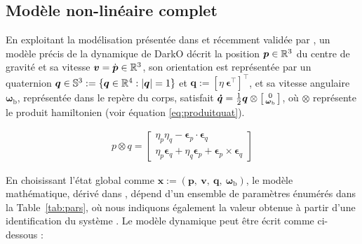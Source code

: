 \subsection{Modèle non-linéaire complet}

En exploitant la modélisation présentée dans \cite{lustosaHal-03035938, olszaneckibarthHal-02542982} et récemment validée par \cite{MuraliMorenoLustosa2024}, un modèle précis de la dynamique de DarkO décrit la position $\boldsymbol{p} \in {\mathbb R}^3$ du centre de gravité et sa vitesse $\boldsymbol{v} = \dot{\boldsymbol{p}} \in {\mathbb R}^3$, son orientation est représentée par un quaternion $\boldsymbol{q} \in {\mathbb S}^3:=\{ \boldsymbol{q} \in {\mathbb R}^4 : |\boldsymbol{q}| = 1\}$ et $\boldsymbol{q} := \left[ \eta ~ \boldsymbol{\epsilon}^\top \right]^\top$, et sa vitesse angulaire $\boldsymbol{\omega}_{\text{b}}$, représentée dans le repère du corps, satisfait $\boldsymbol{\dot q} = \frac{1}{2}\boldsymbol{q} \otimes \left[ \begin{smallmatrix}0 \\ \boldsymbol{\omega}_{{\text{b}}} \end{smallmatrix} \right]$, où $\otimes$ représente le produit hamiltonien (voir équation \eqref{eq:produitquat}).

\begin{align}
    \label{eq:produitquat}
    p \otimes q = \begin{bmatrix}
        \eta_{p} \eta_{q}- \boldsymbol{\epsilon}_{p} \cdot \boldsymbol{\epsilon}_{q}\\
        \eta_{p}\boldsymbol{\epsilon}_{q}+ \eta_{q}\boldsymbol{\epsilon}_{p} + \boldsymbol{\epsilon}_{p} \times \boldsymbol{\epsilon}_{q}
    \end{bmatrix}
\end{align}

En choisissant l'état global comme $\boldsymbol{x}:=(\boldsymbol{p},~ \boldsymbol{v},~ \boldsymbol{q},~ \boldsymbol{\omega}_{\text{b}})$, le modèle mathématique, dérivé dans \cite{lustosaHal-03035938}, dépend d'un ensemble de paramètres énumérés dans la Table~\ref{tab:pars}, où nous indiquons également la valeur obtenue à partir d'une identification du système \cite{sansouStage}. Le modèle dynamique peut être écrit comme ci-dessous :

